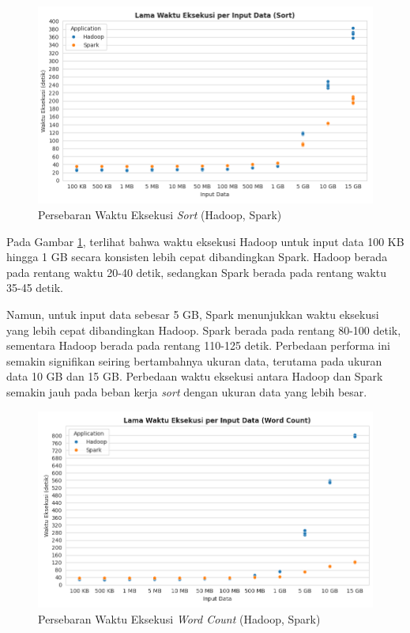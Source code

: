 \begin{figure}[h]
    \centering
    \includegraphics[width=1\textwidth]{figures/ch04/1-lama-waktu-eksekusi-sort.png}
    \caption{Persebaran Waktu Eksekusi \textit{Sort} (Hadoop, Spark)}
    \label{fig:lama-waktu-eksekusi-sort}
\end{figure}

Pada Gambar \ref{fig:lama-waktu-eksekusi-sort}, terlihat bahwa waktu eksekusi Hadoop untuk input data 100 KB hingga 1 GB secara konsisten lebih cepat dibandingkan Spark. Hadoop berada pada rentang waktu 20-40 detik, sedangkan Spark berada pada rentang waktu 35-45 detik.

Namun, untuk input data sebesar 5 GB, Spark menunjukkan waktu eksekusi yang lebih cepat dibandingkan Hadoop. Spark berada pada rentang 80-100 detik, sementara Hadoop berada pada rentang 110-125 detik. Perbedaan performa ini semakin signifikan seiring bertambahnya ukuran data, terutama pada ukuran data 10 GB dan 15 GB. Perbedaan waktu eksekusi antara Hadoop dan Spark semakin jauh pada beban kerja \textit{sort} dengan ukuran data yang lebih besar.

\begin{figure}[h]
    \centering
    \includegraphics[width=1\textwidth]{figures/ch04/1-lama-waktu-eksekusi-wordcount.png}
    \caption{Persebaran Waktu Eksekusi \textit{Word Count} (Hadoop, Spark)}
    \label{fig:lama-waktu-eksekusi-wordcount}
\end{figure}

